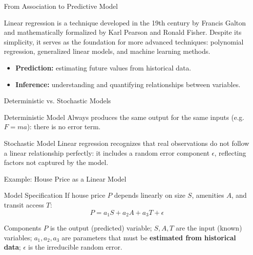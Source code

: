 \documentclass[10pt, aspectratio=169]{beamer}
\begin{document}
\begin{frame}{From Association to Predictive Model}
  \footnotesize
  \begin{motivacion}
    Linear regression is a technique developed in the 19th century by Francis Galton and mathematically formalized by Karl Pearson and Ronald Fisher. Despite its simplicity, it serves as the foundation for more advanced techniques: polynomial regression, generalized linear models, and machine learning methods.
  \end{motivacion}

  \vspace{0.15cm}
  \pause
  \begin{itemize}\itemsep=0.1cm
    \item \textbf{Prediction:} estimating future values from historical data. \pause
    \item \textbf{Inference:} understanding and quantifying relationships between variables.
  \end{itemize}
\end{frame}

\begin{frame}{Deterministic vs. Stochastic Models}
  \footnotesize
  \begin{block}{Deterministic Model}
    Always produces the same output for the same inputs (e.g. $F=ma$): there is no error term.
  \end{block}
  \pause

  \vspace{0.1cm}
  \begin{alertblock}{Stochastic Model}
    Linear regression recognizes that real observations do not follow a linear relationship perfectly: it includes a random error component $\epsilon$, reflecting factors not captured by the model.
  \end{alertblock}
\end{frame}

\begin{frame}{Example: House Price as a Linear Model}
  \footnotesize
  \begin{block}{Model Specification}
    If house price $P$ depends linearly on size $S$, amenities $A$, and transit access $T$:
    $$P = a_1 S + a_2 A + a_3 T + \epsilon$$
  \end{block}
  \pause

  \vspace{0.1cm}
  \begin{alertblock}{Components}
    $P$ is the output (predicted) variable; $S,A,T$ are the input (known) variables; $a_1,a_2,a_3$ are parameters that must be \textbf{estimated from historical data}; $\epsilon$ is the irreducible random error.
  \end{alertblock}
\end{frame}
\end{document}
